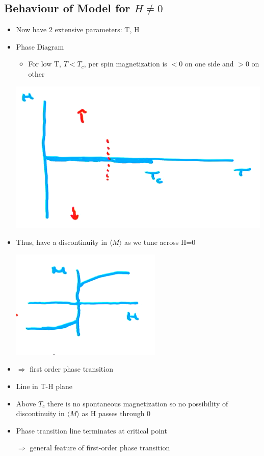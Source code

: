 \subsection{Behaviour of Model for $H\neq 0$}

\begin{itemize}
    \item Now have 2 extensive parameters: T, H

    \item Phase Diagram

    \begin{itemize}
        \item For low T, $T<T_c$, per spin magnetization is $<0$ on one side and $>0$ on other
    \end{itemize}

    \begin{center}
        \includegraphics[width = 0.5\linewidth]{Images/H0_ising.png}
    \end{center}

    \item Thus, have a discontinuity in $\langle M \rangle $ as we tune across H=0
    \begin{center}
        \includegraphics[width = 0.5\linewidth]{Images/MH_ising.png}
    \end{center}

    \item $\Rightarrow$ first order phase transition 
    \item Line in T-H plane 
    \item Above $T_c$ there is no spontaneous magnetization so no possibility of discontinuity in $\langle M \rangle$ as H passes through 0
    
    \item Phase transition line terminates at critical point

    $\Rightarrow$ general feature of first-order phase transition
    
\end{itemize}


